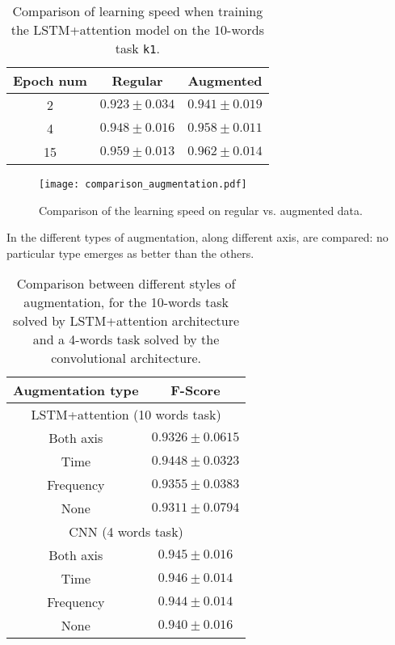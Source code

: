 \begin{table}[t!]
    \centering
    \caption{Comparison of learning speed when training the LSTM+attention
    model on the $10$-words task \texttt{k1}.}
    \label{tab:augmentation_learning_speed}
    \begin{tabular}{|c|c|c|}
        \hline
        Epoch num & Regular & Augmented \\
        \hline
        2 & $0.923 \pm 0.034$ & $0.941 \pm 0.019$ \\
        4 & $0.948 \pm 0.016$ & $0.958 \pm 0.011$ \\
        15 & $0.959 \pm 0.013$ & $0.962 \pm 0.014$ \\
        \hline
    \end{tabular}
\end{table}

\begin{figure}[t!]
    \centering
    \texttt{[image: comparison\_augmentation.pdf]}
    \caption{Comparison of the learning speed on regular vs. augmented data.}%
    \label{fig:augmentation_learning_speed}
\end{figure}

In  the different types of
augmentation, along different axis, are compared:
no particular type emerges as better than the others.

\begin{table}[t!]
    \centering
    \caption{Comparison between different styles of augmentation,
    for the 10-words task solved by LSTM+attention architecture and a
    4-words task solved by the convolutional architecture.}
    \label{tab:att_augmentation_comparison}
    \begin{tabular}{|c|c|}
        \hline
        Augmentation type & F-Score \\
        \hline
        \hline
        \multicolumn{2}{|c|}{LSTM+attention (10 words task)} \\
        \hline
        Both axis & $0.9326 \pm 0.0615$ \\
        Time      & $0.9448 \pm 0.0323$ \\
        Frequency & $0.9355 \pm 0.0383$ \\
        None      & $0.9311 \pm 0.0794$ \\
        \hline
        \hline
        \multicolumn{2}{|c|}{CNN (4 words task)} \\
        \hline
        Both axis & $0.945 \pm 0.016$ \\
        Time      & $0.946 \pm 0.014$ \\
        Frequency & $0.944 \pm 0.014$ \\
        None      & $0.940 \pm 0.016$ \\
        \hline
    \end{tabular}
\end{table}

